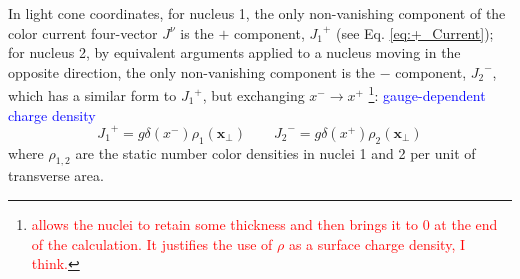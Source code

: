 
In light cone coordinates, for nucleus 1, the only non-vanishing component of the color current four-vector $J^\nu$ is the $+$ component, ${J_1}^+$ (see Eq. \ref{eq:+_Current}); for nucleus 2, by equivalent arguments applied to a nucleus moving in the opposite direction, the only non-vanishing component is the $-$ component, ${J_2}^-$, which has a similar form to ${J_1}^+$, but exchanging $x^- \to x^+$ \textcolor{red}{\footnote{\textcolor{red}{\cite{Carrington_2022_Energy_Momentum_Tensor} \cite{Gelis_Habilitation} allows the nuclei to retain some thickness and then brings it to 0 at the end of the calculation. It justifies the use of $\rho$ as a surface charge density, I think.}}}: \textcolor{blue}{gauge-dependent charge density}
\begin{equation*}
	{J_1}^+ = g \delta (x^-) \rho_1 (\mathbf{x}_\perp) \qquad {J_2}^- = g \delta (x^+) \rho_2 (\mathbf{x}_\perp)
\end{equation*}
where $\rho_{1,2}$ are the static number color densities in nuclei 1 and 2 per unit of transverse area. 

